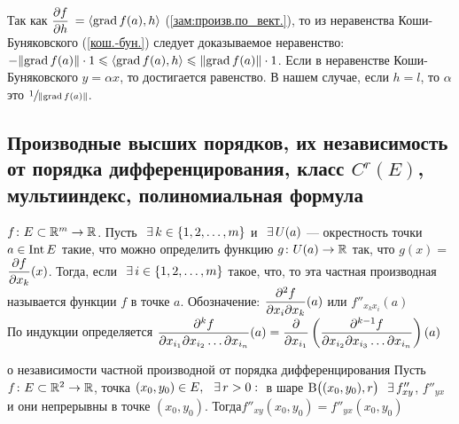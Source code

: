 \begin{prf} %
	Так как {\small$\displaystyle\frac{\partial f}{\partial h}$} $= \left<\mathrm{grad\,} f(a), h\right>$ (\ref{зам:произв.по_вект.}), 
	то из неравенства Коши-Буняковского (\ref{кош.-бун.}) следует доказываемое неравенство: 
	$-\|\mathrm{grad\,} f(a)\| \cdot 1 \leqslant \left<\mathrm{grad\,} f(a), h\right> \leqslant \|\mathrm{grad\,} f(a)\| \cdot 1$.
	Если в неравенстве Коши-Буняковского  $y = \alpha x$, 
	то достигается равенство. В нашем случае, если  
	$h = l$, то $\alpha$ это $\sfrac{1}{\|\mathrm{grad\,} f(a)\|}$.
\end{prf} %

\subsection{Производные высших порядков, их независимость от порядка дифференцирования, класс $C^r(E)$, мультииндекс, полиномиальная формула}

\begin{opr}
	$f\colon E \subset \mathbb R^m \to \mathbb R$. Пусть$\E k \in \{1, 2, \dots, m\}$ и$\E U(a)$ --- окрестность точки $a \in \mathrm{Int}\, E$\linebreak
	такие, что можно определить функцию $g\colon U(a) \to \mathbb R$ так, что $g(x) ={}${\small$\displaystyle\frac{\partial f}{\partial x_k}(x)$}.
	Тогда, если$\E i\in \{1, 2, \dots, m\}$ такое, что, то эта частная производная называется
	функции $f$ в точке $a$.  \smallskip 
	Обозначение: {\small$\displaystyle\frac{\partial ^2f}{\partial x_i\partial x_k}(a)$}
	или $f''_{x_kx_i}(a)$\\
	По индукции определяется {\small$\displaystyle\frac{\partial ^kf}{\partial x_{i_1} \partial x_{i_2} \dots \partial x_{i_n}}(a) =
	\frac{\partial }{\partial x_{i_1}}\left( \frac{\partial ^{k-1}f}{\partial x_{i_2} \partial x_{i_3} \dots \partial x_{i_n}}\right)(a) $}
	
\end{opr}

\begin{teor}[https://www.youtube.com/live/oWtiSJdhQV8?si=YUdpoEusMGWZikUh&t=3917]{о независимости частной производной от порядка дифференцирования}
	Пусть $f\colon E \subset \mathbb R^2 \to \mathbb R$, точка $(x_0, y_0) \in E, \E r > 0 :{}$ в шаре $\BB{(x_0, y_0), r} \E f''_{xy}$, $f''_{yx}$
	и они непрерывны в точке $(x_0, y_0)$. Тогда$f''_{xy}(x_0, y_0) = f''_{yx}(x_0, y_0)$
\end{teor} %

